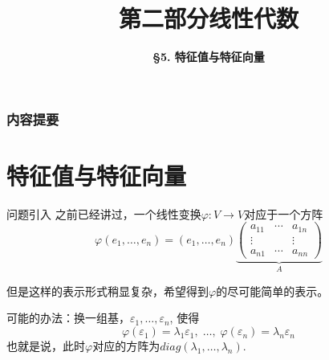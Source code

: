 \documentclass[10pt]{beamer}
\title[Linear Algebra]{\LARGE \bfseries 第二部分\quad 线性代数} %
\author[Eigenvalue and Eigenvector] %
{\Large \bfseries \S 5. 特征值与特征向量}
\date{}
\begin{document}

\begin{frame}

\titlepage %

\end{frame}


\begin{frame}
\frametitle{内容提要} %
\tableofcontents %
\end{frame}



\section{特征值与特征向量}


\begin{frame}

\begin{block}{问题引入}
之前已经讲过，一个线性变换$\varphi: V \to V$对应于一个方阵
$$\varphi(e_1, \ldots, e_n) = (e_1, \ldots, e_n) \underbrace{\begin{pmatrix}
a_{11} & \cdots & a_{1n} \\ \vdots & & \vdots \\ a_{n1} & \cdots & a_{nn} \end{pmatrix}}_{A}$$

\pause

但是这样的表示形式稍显复杂，希望得到$\varphi$的尽可能简单的表示。

\pause

可能的办法：换一组基，$\varepsilon_1, \ldots, \varepsilon_n$, 使得
$$\varphi(\varepsilon_1) = \lambda_1 \varepsilon_1, \; \ldots, \; \varphi(\varepsilon_n) = \lambda_n\varepsilon_n$$
也就是说，此时$\varphi$对应的方阵为$diag(\lambda_1 , \ldots, \lambda_n)$.
\end{block}

\end{frame}
\end{document}
